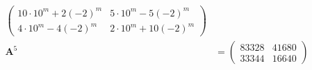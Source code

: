 \documentclass{article}
\begin{document}
\begin{align*}
\begin{pmatrix}
                                                             10 \cdot 10^m + 2 (-2)^m & 5 \cdot 10^m - 5 (-2)^m  \\
                                                             4 \cdot 10^m - 4 (-2)^m  & 2 \cdot 10^m + 10 (-2)^m
                                                           \end{pmatrix} \\
  \mathbf{A}^5                            & = \begin{pmatrix}
                                                83328 & 41680 \\
                                                33344 & 16640
                                              \end{pmatrix}
\end{align*}

\setcounter{subsubsection}{10}
\subsubsection{}
\end{document}
